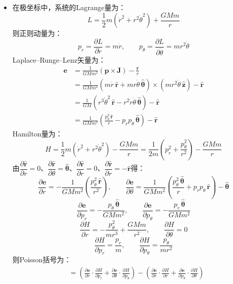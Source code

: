 \documentclass[a4paper,fontset=windows]{ctexart}
\begin{document}
\begin{itemize}
        \item[6.6.(1)]
        在极坐标中，系统的Lagrange量为：
        \[
        L = \frac{1}{2}m(\dot{r}^2 + r^2\dot{\theta}^2) + \frac{GMm}{r}
        \]
        则正则动量为：
        \[
        p_r = \frac{\partial L}{\partial\dot{r}} = m\dot{r},\qquad p_\theta = \frac{\partial L}{\partial\dot{\theta}} = mr^2\dot{\theta}
        \]
        Laplace–Runge–Lenz矢量为：
        \begin{align*}
            \bm{e}
            &= \frac{1}{GMm^2}(\bm{p} \times \bm{J}) - \frac{\bm{r}}{r} \\
            &= \frac{1}{GMm^2}(m\dot{r}\,\bm{\hat{r}} + mr\dot{\theta}\,\bm{\hat{\theta}}) \times (mr^2\dot{\theta}\,\bm{\hat{z}}) - \bm{\hat{r}} \\
            &= \frac{1}{GM}(r^3\dot{\theta}^2\,\bm{\hat{r}} - r^2\dot{r}\dot{\theta}\,\bm{\hat{\theta}}) - \bm{\hat{r}} \\
            &= \frac{1}{GMm^2}\left(\frac{p_\theta^2\,\bm{\hat{r}}}{r} - p_r p_\theta\,\bm{\hat{\theta}}\right) - \bm{\hat{r}}
        \end{align*}
        Hamilton量为：
        \[
        H = \frac{1}{2}m(\dot{r}^2 + r^2\dot{\theta}^2) - \frac{GMm}{r} = \frac{1}{2m}(p_r^2 + \frac{p_\theta^2}{r^2}) - \frac{GMm}{r}
        \]
        由$\dfrac{\partial\bm{\hat{r}}}{\partial r} = 0$、$\dfrac{\partial\bm{\hat{r}}}{\partial\theta} = \bm{\hat{\theta}}$、$\dfrac{\partial\bm{\hat{r}}}{\partial r} = 0$、$\dfrac{\partial\bm{\hat{r}}}{\partial r} = -\bm{\hat{r}}$得：
        \[
        \frac{\partial\bm{e}}{\partial r} = -\frac{1}{GMm^2}\left(\frac{p_\theta^2\,\bm{\hat{r}}}{r^2}\right),\qquad \frac{\partial\bm{e}}{\partial\theta} = \frac{1}{GMm^2}\left(\frac{p_\theta^2\,\bm{\hat{\theta}}}{r} + p_r p_\theta\,\bm{\hat{r}}\right) - \bm{\hat{\theta}}
        \]
        \[
        \frac{\partial\bm{e}}{\partial p_r} = -\frac{p_\theta\,\bm{\hat{\theta}}}{GMm^2},\qquad \frac{\partial\bm{e}}{\partial p_\theta} = -\frac{p_r\,\bm{\hat{\theta}}}{GMm^2}
        \]
        \[
        \frac{\partial H}{\partial r} = -\frac{p_\theta^2}{mr^3} + \frac{GMm}{r^2},\qquad \frac{\partial H}{\partial\theta} = 0
        \]
        \[
        \frac{\partial H}{\partial p_r} = \frac{p_r}{m},\qquad \frac{\partial H}{\partial p_\theta} = \frac{p_\theta}{mr^2}
        \]
        则Poisson括号为：
        \begin{align*}
            [\bm{e},H]
            &= \left(\frac{\partial\bm{e}}{\partial r} \cdot \frac{\partial H}{\partial p_r} + \frac{\partial\bm{e}}{\partial\theta} \cdot \frac{\partial H}{\partial p_\theta}\right) - \left(\frac{\partial\bm{e}}{\partial r} \cdot \frac{\partial H}{\partial r} + \frac{\partial\bm{e}}{\partial p_\theta} \cdot \frac{\partial H}{\partial\theta}\right) \\

\end{align*}
\end{itemize}
\end{document}
